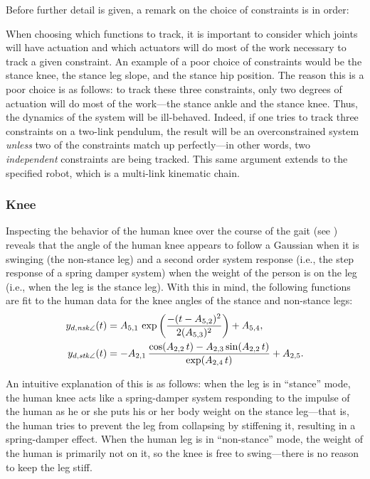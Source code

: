 Before further detail is given, a remark on the choice of constraints is in
order:
%
\begin{remark} \label{rmk:actuation}
  When choosing which functions to track, it is important to consider which
  joints will have actuation and which actuators will do most of the work
  necessary to track a given constraint.
  An example of a poor choice of constraints would be the stance knee, the
  stance leg slope, and the stance hip position.
  The reason this is a poor choice is as follows:
  to track these three constraints, only two degrees of actuation will do most
  of the work---the stance ankle and the stance knee.
  Thus, the dynamics of the system will be ill-behaved.
  Indeed, if one tries to track three constraints on a two-link pendulum, the
  result will be an overconstrained system {\em unless} two of the constraints
  match up perfectly---in other words, two {\em independent} constraints are
  being tracked.
  This same argument extends to the specified robot, which is a multi-link
  kinematic chain.
\end{remark}

\subsubsection{Knee}

Inspecting the behavior of the human knee over the course of the gait (see
) reveals that the angle of the human knee appears
to follow a Gaussian when it is swinging (the non-stance leg) and a second order
system response (i.e., the step response of a spring damper system) when the
weight of the person is on the leg (i.e., when the leg is the stance leg).
%
With this in mind, the following functions are fit to the human data for the
knee angles of the stance and non-stance legs:
%
\begin{align*}
  y_{d,\mathit{nsk}\angle}(t) &= A_{5,1} \, \exp\left(\frac{-(t-A_{5,2})^2}{2
      (A_{5,3})^2}\right) + A_{5,4},\\
  y_{d,\mathit{stk}\angle}(t) &= -A_{2,1} \, \frac{\cos(A_{2,2}\,t)-A_{2,3}
    \sin(A_{2,2}\,t)}{\exp(A_{2,4} \, t)} + A_{2,5}. 
\end{align*}
%

An intuitive explanation of this is as follows:
%
when the leg is in ``stance'' mode, the human knee acts like a spring-damper
system responding to the impulse of the human as he or she puts his or her body
weight on the stance leg---that is, the human tries to prevent the leg from
collapsing by stiffening it, resulting in a spring-damper effect. When the human
leg is in ``non-stance'' mode, the weight of the human is primarily not on it,
so the knee is free to swing---there is no reason to keep the leg stiff.

